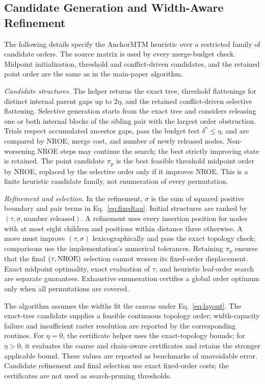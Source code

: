 \documentclass[preprint]{vgtc}   %
\begin{document}
\subsection{Candidate Generation and Width-Aware Refinement}\label{sec:search}
The following details specify the AnchorMTM heuristic over a restricted family of candidate orders. The source matrix is used by every merge-budget check. Midpoint initialization, threshold and conflict-driven candidates, and the retained point order are the same as in the main-paper algorithm.

\emph{Candidate structures.} The helper returns the exact tree, threshold flattenings for distinct internal parent gaps up to $2\eta$, and the retained conflict-driven selective flattening. Selective generation starts from the exact tree and considers releasing one or both internal blocks of the sibling pair with the largest order obstruction. Trials respect accumulated ancestor gaps, pass the budget test $\delta^*\le\eta$, and are compared by NROE, merge cost, and number of newly released nodes. Non-worsening NROE steps may continue the search; the best strictly improving state is retained. The point candidate $\pi_p$ is the best feasible threshold midpoint order by NROE, replaced by the selective order only if it improves NROE. This is a finite heuristic candidate family, not enumeration of every permutation.

\emph{Refinement and selection.} In the refinement, $\sigma$ is the sum of squared positive boundary and pair terms in Eq.~\ref{eq:fixedtau}. Initial structures are ranked by $(\tau,\sigma,\text{number released})$. A refinement uses every insertion position for nodes with at most eight children and positions within distance three otherwise. A move must improve $(\tau,\sigma)$ lexicographically and pass the exact topology check; comparisons use the implementation's numerical tolerances. Retaining $\pi_p$ ensures that the final $(\tau,\mathrm{NROE})$ selection cannot worsen its fixed-order displacement. Exact midpoint optimality, exact evaluation of $\tau$, and heuristic leaf-order search are separate guarantees. Exhaustive enumeration certifies a global order optimum only when all permutations are covered.

The algorithm assumes the widths fit the canvas under Eq.~\ref{eq:layout}. The exact-tree candidate supplies a feasible continuous topology order; width-capacity failure and insufficient raster resolution are reported by the corresponding routines. For $\eta=0$, the certificate helper uses the exact-topology bounds; for $\eta>0$, it evaluates the coarse and chain-aware certificates and retains the stronger applicable bound. These values are reported as benchmarks of unavoidable error. Candidate refinement and final selection use exact fixed-order costs; the certificates are not used as search-pruning thresholds.
\end{document}
